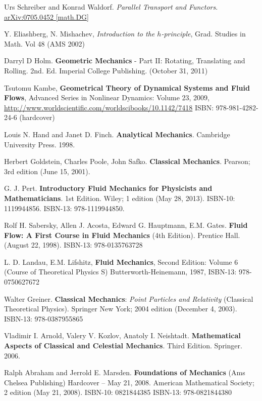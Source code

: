 \documentclass[10pt]{amsart}
\begin{document}
\begin{thebibliography}{9}
Urs Schreiber and Konrad Waldorf.  \emph{Parallel Transport and Functors}.  \href{https://arxiv.org/pdf/0705.0452.pdf}{arXiv:0705.0452 [math.DG]}

Y. Eliashberg, N. Mishachev, \emph{Introduction to the $h$-principle}, Grad. Studies in Math. Vol 48 (AMS 2002)

Darryl D Holm. \textbf{Geometric Mechanics} - Part II: Rotating, Translating and Rolling. 2nd. Ed. Imperial College Publishing. (October 31, 2011) 

Tsutomu Kambe, \textbf{Geometrical Theory of Dynamical Systems and Fluid Flows}, Advanced Series in Nonlinear Dynamics: Volume 23, 2009, \url{http://www.worldscientific.com/worldscibooks/10.1142/7418} ISBN: 978-981-4282-24-6 (hardcover)

Louis N. Hand and Janet D. Finch. \textbf{Analytical Mechanics}. Cambridge University Press. 1998. 

Herbert Goldstein, Charles Poole, John Safko. \textbf{Classical Mechanics}. Pearson; 3rd edition (June 15, 2001).

G. J. Pert. \textbf{Introductory Fluid Mechanics for Physicists and Mathematicians}. 1st Edition. Wiley; 1 edition (May 28, 2013). ISBN-10: 1119944856. ISBN-13: 978-1119944850. 

Rolf H. Sabersky, Allen J. Acosta, Edward G. Hauptmann, E.M. Gates.  \textbf{Fluid Flow: A First Course in Fluid Mechanics} (4th Edition).  Prentice Hall. (August 22, 1998).  ISBN-13: 978-0135763728

L. D. Landau, E.M. Lifshitz, \textbf{Fluid Mechanics}, Second Edition: Volume 6 (Course of Theoretical Physics S) Butterworth-Heinemann, 1987, ISBN-13: 978-0750627672


Walter Greiner. \textbf{Classical Mechanics}: \emph{Point Particles and Relativity} (Classical Theoretical Physics). Springer New York; 2004 edition (December 4, 2003). ISBN-13: 978-0387955865

Vladimir I. Arnold, Valery V. Kozlov, Anatoly I. Neishtadt.  \textbf{Mathematical Aspects of Classical and Celestial Mechanics}.  Third Edition.  Springer. 2006.  

Ralph Abraham and Jerrold E. Marsden. 
\textbf{Foundations of Mechanics} (Ams Chelsea Publishing) Hardcover – May 21, 2008.  American Mathematical Society; 2 edition (May 21, 2008). ISBN-10: 0821844385
ISBN-13: 978-0821844380


\end{thebibliography}
\end{document}
